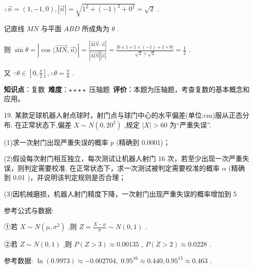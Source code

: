 \documentclass[10pt]{article}
\begin{document}
\(\therefore \overrightarrow{n} = \left( {1, - 1,0}\right) ,\left| \overrightarrow{n}\right|  = \sqrt{{1}^{2} + {\left( -1\right) }^{2} + {0}^{2}} = \sqrt{2}\) .

记直线 \({MN}\) 与平面 \({ABD}\) 所成角为 \(\theta\) .

则 \(\sin \theta  = \left| {\cos \langle \overrightarrow{MN},\overrightarrow{n}\rangle }\right|  = \frac{\left| \overrightarrow{MN} \cdot  \overrightarrow{n}\right| }{\left| \overrightarrow{MN}\right| \left| \overrightarrow{n}\right| } = \frac{\left| 0 \times  1 + 1 \times  \left( -1\right)  + 1 \times  0\right| }{\sqrt{2} \times  \sqrt{2}} = \frac{1}{2}\) .

又 \(\because \theta  \in  \left\lbrack  {0,\frac{\pi }{2}}\right\rbrack  ,\therefore \theta  = \frac{\pi }{6}\) .

\begin{analysisbox}[考点分析]
\textbf{知识点}：复数\
\textbf{难度}：$\star\star\star\star$ 压轴题\
\textbf{评价}：本题为压轴题，考查复数的基本概念和应用。
\end{analysisbox}

19. 某款足球机器人射点球时，射门点与球门中心的水平偏差(单位:cm)服从正态分布. 在正常状态下,偏差 \(X \sim  N\left( {0,{20}^{2}}\right)\) ,规定 \(\left| X\right|  > {60}\) 为“严重失误”.

(1)求一次射门出现严重失误的概率 \(p\) (精确到 0.0001)；

(2)假设每次射门相互独立，每次测试让机器人射门 16 次，若至少出现一次严重失误，则判定需要校准. 在正常状态下，求一次测试被判定需要校准的概率 \(\alpha\) (精确到 0.01 )，并说明该判定规则是否合理；

(3)因机械磨损，机器人射门精度下降，一次射门出现严重失误的概率增加到 5%

参考公式与数据:

①若 \(X \sim  N\left( {\mu ,{\sigma }^{2}}\right)\) ,则 \(Z = \frac{X - \mu }{\sigma } \sim  N\left( {0,1}\right)\) .

②若 \(Z \sim  N\left( {0,1}\right)\) ,则 \(P\left( {Z > 3}\right)  \approx  {0.00135}\) , \(P\left( {Z > 2}\right)  \approx  {0.0228}\) .

参考数据: \(\ln \left( {0.9973}\right)  \approx   - {0.002704},\;{0.95}^{16} \approx  {0.440},{0.95}^{15} \approx  {0.463}\) .
\end{document}

